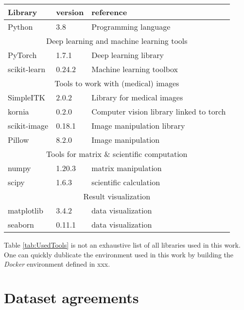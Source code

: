 \begin{SCtable}[\sidecaptionrelwidth][h]
 
  \begin{tabular}{ p{2cm} l l } 
   \hline
   \hline
   \textbf{Library} & \textbf{version} & \textbf{reference}    \\
   \hline 
  Python & 3.8 & Programming language \\
   \hline
   \multicolumn{3}{c}{Deep learning and machine learning tools} \\
   \hline
   PyTorch & 1.7.1 & Deep learning library \\ 
   scikit-learn & 0.24.2 & Machine learning toolbox \\
   \hline
   \multicolumn{3}{c}{Tools to work with (medical) images} \\
   \hline
   SimpleITK & 2.0.2 & Library for medical images \\ 
   kornia & 0.2.0 & Computer vision library linked to torch \\
   scikit-image & 0.18.1 & Image manipulation library \\
   Pillow & 8.2.0 & Image manipulation\\
   \hline
   \multicolumn{3}{c}{Tools for matrix \& scientific computation} \\
   \hline
   numpy & 1.20.3 & matrix manipulation \\
   scipy & 1.6.3 & scientific calculation \\
   \hline
   \multicolumn{3}{c}{Result visualization} \\
   \hline
   matplotlib & 3.4.2 & data visualization \\ 
   seaborn & 0.11.1 & data visualization \\
   \hline
   \hline
  \end{tabular}
  \caption{Python libraries used. \label{tab:UsedTools}}

\end{SCtable}

Table \ref{tab:UsedTools} is not an exhaustive list of all libraries used in this work.
One can quickly dublicate the environment used in this work by building the \textit{Docker} environment defined in xxx.



\chapter{Dataset agreements\label{seg:datasetagreement}}

